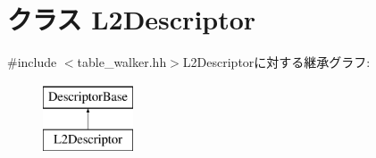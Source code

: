 \hypertarget{classArmISA_1_1TableWalker_1_1L2Descriptor}{
\section{クラス L2Descriptor}
\label{classArmISA_1_1TableWalker_1_1L2Descriptor}
}


{\ttfamily \#include $<$table\_\-walker.hh$>$}L2Descriptorに対する継承グラフ:\begin{figure}[H]
\begin{center}
\leavevmode
\includegraphics[height=2cm]{classArmISA_1_1TableWalker_1_1L2Descriptor}
\end{center}
\end{figure}
